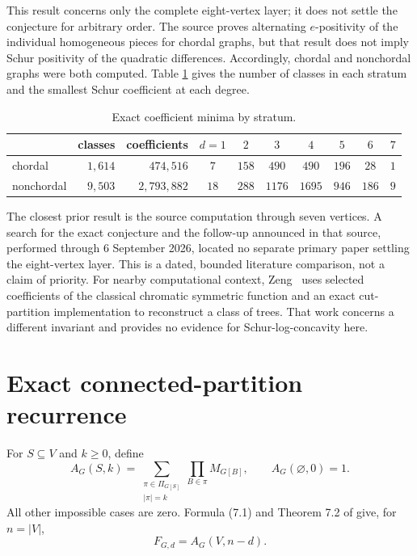 \documentclass[11pt]{article}
\begin{document}
This result concerns only the complete eight-vertex layer; it does not settle
the conjecture for arbitrary order.  The source proves alternating
$e$-positivity of the individual homogeneous pieces for chordal graphs, but
that result does not imply Schur positivity of the quadratic differences.
Accordingly, chordal and nonchordal graphs were both computed.  Table
\ref{tab:minima} gives the number of classes in each stratum and the smallest
Schur coefficient at each degree.

\begin{table}[ht]
\centering
\caption{Exact coefficient minima by stratum.}
\label{tab:minima}
\begin{tabular}{lrrccccccc}
\toprule
 & classes & coefficients & $d=1$ & $2$ & $3$ & $4$ & $5$ & $6$ & $7$ \\
\midrule
chordal    & $1{,}614$ & $474{,}516$   & $7$  & $158$ & $490$  & $490$  & $196$ & $28$  & $1$ \\
nonchordal & $9{,}503$ & $2{,}793{,}882$ & $18$ & $288$ & $1176$ & $1695$ & $946$ & $186$ & $9$ \\
\bottomrule
\end{tabular}
\end{table}

The closest prior result is the source computation through seven vertices.
A search for the exact conjecture and the follow-up announced in that source,
performed through 6 September 2026, located no separate primary paper settling
the eight-vertex layer.  This is a dated, bounded literature comparison, not a
claim of priority.  For nearby computational context, Zeng~\cite{zeng2026}
uses selected coefficients of the classical chromatic symmetric function and
an exact cut-partition implementation to reconstruct a class of trees.  That
work concerns a different invariant and provides no evidence for
Schur-log-concavity here.

\section{Exact connected-partition recurrence}

For $S\subseteq V$ and $k\geq0$, define
\[
 A_G(S,k)=
 \sum_{\substack{\pi\in\Pi_{G[S]}\\|\pi|=k}}
 \prod_{B\in\pi}M_{G[B]},
 \qquad A_G(\varnothing,0)=1.
\]
All other impossible cases are zero.  Formula (7.1) and Theorem 7.2 of
\cite{gonzalez-wachs2026} give, for $n=|V|$,
\begin{equation}\label{eq:FfromA}
  F_{G,d}=A_G(V,n-d).
\end{equation}
\end{document}
